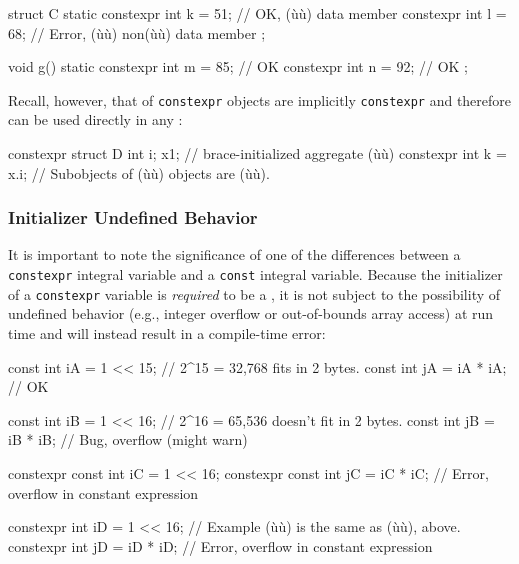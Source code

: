 \begin{enumerate}
{\begin{emcppslisting}
struct C
{
    static constexpr int k = 51;  // OK, (ù{}ù) data member
           constexpr int l = 68;  // Error, (ù{}ù) non(ù{}ù) data member
};

void g()
{
    static constexpr int m = 85;  // OK
           constexpr int n = 92;  // OK
};
\end{emcppslisting}
    
\noindent Recall, however, that  of
\lstinline!constexpr! objects are implicitly \lstinline!constexpr! and
therefore can be used directly in any :

\begin{emcppslisting}
constexpr struct D { int i; } x{1};  // brace-initialized aggregate (ù{}ù)
constexpr int k = x.i;  // Subobjects of (ù{}ù) objects are (ù{}ù).
\end{emcppslisting}
}
\end{enumerate}

\subsubsection[Initializer Undefined Behavior]{Initializer Undefined Behavior}

It is important to note the significance of one of the
differences between a \lstinline!constexpr! integral variable and a
\lstinline!const! integral variable. Because the initializer of a
\lstinline!constexpr! variable is \emph{required} to be a , it is not subject to the possibility of undefined behavior
(e.g., integer overflow or out-of-bounds array access) at run time and will
instead result in a compile-time error:

\begin{emcppslisting}
          const int iA = 1 << 15;  // 2^15 = 32,768 fits in 2 bytes.
          const int jA = iA * iA;  // OK

          const int iB = 1 << 16;  // 2^16 = 65,536 doesn't fit in 2 bytes.
          const int jB = iB * iB;  // Bug, overflow (might warn)

constexpr const int iC = 1 << 16;
constexpr const int jC = iC * iC;  // Error, overflow in constant expression

constexpr       int iD = 1 << 16;  // Example (ù{}ù) is the same as (ù{}ù), above.
constexpr       int jD = iD * iD;  // Error, overflow in constant expression
\end{emcppslisting}
    
